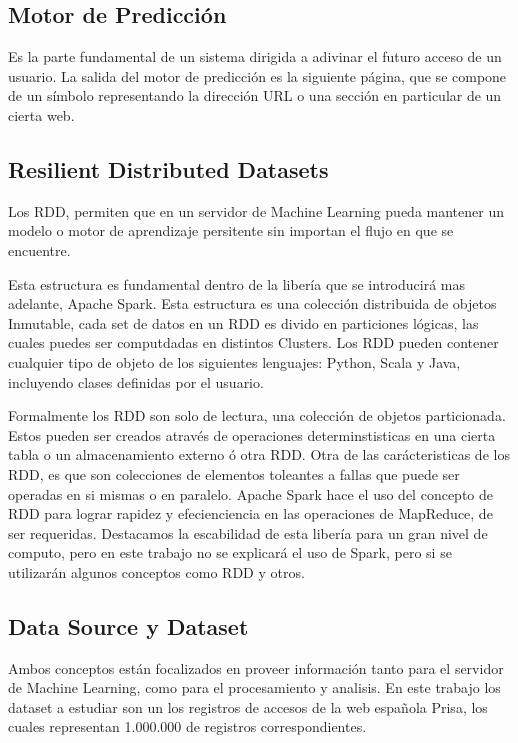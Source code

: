 \subsection{Motor de Predicción}

Es la parte fundamental de un sistema dirigida a adivinar el futuro acceso de un usuario. La salida del motor de predicción es la siguiente página, que se compone de un símbolo representando la dirección URL o una sección en particular de un cierta web. 



\subsection{Resilient Distributed Datasets }

	Los RDD, permiten que en un servidor de Machine Learning pueda mantener un modelo o motor de aprendizaje persitente sin importan el flujo en que se encuentre.

	Esta estructura es fundamental dentro de la libería que se introducirá mas adelante, Apache Spark. Esta estructura es una colección distribuida de objetos Inmutable, cada 
	set de datos en un RDD es divido en particiones lógicas, las cuales puedes ser computdadas en distintos Clusters. Los RDD pueden contener cualquier tipo de objeto de los siguientes lenguajes: Python, Scala y Java, incluyendo clases definidas por el usuario. 

	Formalmente los RDD son solo de lectura, una colección de objetos particionada. Estos pueden ser creados através de  operaciones determinstisticas en una cierta tabla o un almacenamiento externo ó otra RDD.
	Otra de las carácteristicas de los RDD, es que son colecciones de elementos toleantes a fallas que puede ser operadas en si mismas o en paralelo.
	Apache Spark hace el uso del concepto de RDD para lograr rapidez y efecienciencia en las operaciones de MapReduce, de ser requeridas. Destacamos la escabilidad de esta libería para un gran nivel de computo, pero en este trabajo no se explicará el uso de Spark, pero si se utilizarán algunos conceptos como RDD y otros.




\subsection{Data Source y Dataset }

	Ambos conceptos están focalizados en  proveer información tanto para el servidor de Machine Learning, como para el procesamiento y analisis.
	En este trabajo los dataset a estudiar son un los registros de accesos de la web española Prisa, los cuales representan 1.000.000 de registros correspondientes.


